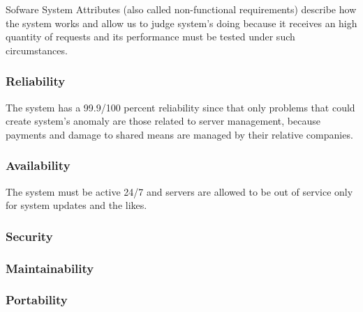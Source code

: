 Sofware System Attributes (also called non-functional requirements) describe how the system works and allow us to judge system's doing because it receives an high quantity of requests and its performance must be tested under such circumstances.

\subsubsection{Reliability}
The system has a 99.9/100 percent reliability since that only problems that could create system's anomaly are those related to server management, because payments and damage to shared means are managed by their relative companies.

\subsubsection{Availability}
The system must be active 24/7 and servers are allowed to be out of service only for system updates and the likes.

\subsubsection{Security}

\subsubsection{Maintainability}

\subsubsection{Portability}
